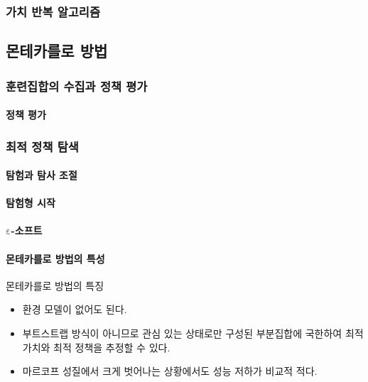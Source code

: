 \documentclass [12pt] {oblivoir}
\let\oldsubsubsection=\subsubsection
\renewcommand{\subsubsection}
{
  \filbreak
  \oldsubsubsection
}
\begin{document}
\subsubsection{가치 반복 알고리즘}

\subsection{몬테카를로 방법}

\subsubsection{훈련집합의 수집과 정책 평가}

\paragraph*{정책 평가}\mbox{}

\vspace{3mm}

\subsubsection{최적 정책 탐색}

\paragraph*{탐험과 탐사 조절}\mbox{}

\vspace{3mm}

\paragraph*{탐험형 시작}\mbox{}

\vspace{3mm}

\paragraph*{$\boldsymbol{\mathrm{\varepsilon}}$-소프트}\mbox{}

\vspace{3mm}

\paragraph*{몬테카를로 방법의 특성}\mbox{}

몬테카를로 방법의 특징
\begin{itemize}
  \item 환경 모델이 없어도 된다.
  \item 부트스트랩 방식이 아니므로 관심 있는 상태로만 구성된 부분집합에 국한하여 최적 가치와 최적 정책을 추정할 수 있다.
  \item 마르코프 성질에서 크게 벗어나는 상황에서도 성능 저하가 비교적 적다.
\end{itemize}
\end{document}
